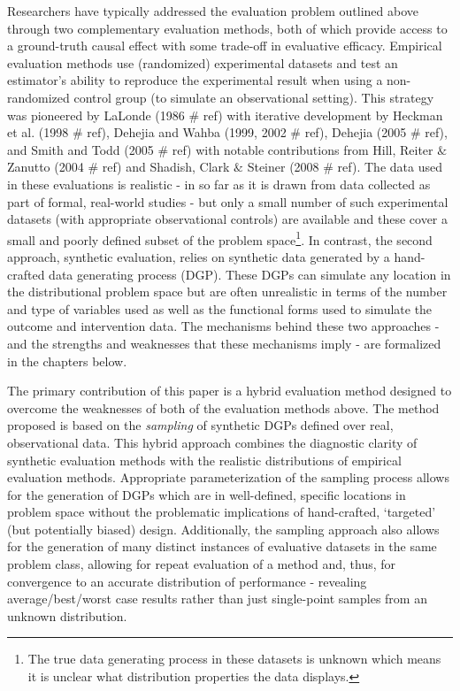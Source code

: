\documentclass[../main.tex]{subfiles}
\begin{document}
\vspace{\baselineskip}
Researchers have typically addressed the evaluation problem outlined above through two complementary evaluation methods, both of which provide access to a ground-truth causal effect with some trade-off in evaluative efficacy. Empirical evaluation methods use (randomized) experimental datasets and test an estimator’s ability to reproduce the experimental result when using a non-randomized control group (to simulate an observational setting). This strategy was pioneered by LaLonde (1986 $\#$ ref) with iterative development by Heckman et al. (1998 $\#$ ref), Dehejia and Wahba (1999, 2002 $\#$ ref), Dehejia (2005 $\#$ ref), and Smith and Todd (2005 $\#$ ref) with notable contributions from Hill, Reiter $\&$  Zanutto (2004 $\#$ ref) and Shadish, Clark $\&$  Steiner (2008 $\#$ ref). The data used in these evaluations is realistic - in so far as it is drawn from data collected as part of formal, real-world studies - but only a small number of such experimental datasets (with appropriate observational controls) are available and these cover a small and poorly defined subset of the problem space\footnote{ The true data generating process in these datasets is unknown which means it is unclear what distribution properties the data displays. }. In contrast, the second approach, synthetic evaluation, relies on synthetic data generated by a hand-crafted data generating process (DGP). These DGPs can simulate any location in the distributional problem space but are often unrealistic in terms of the number and type of variables used as well as the functional forms used to simulate the outcome and intervention data. The mechanisms behind these two approaches - and the strengths and weaknesses that these mechanisms imply - are formalized in the chapters below.\par


\vspace{\baselineskip}
The primary contribution of this paper is a hybrid evaluation method designed to overcome the weaknesses of both of the evaluation methods above. The method proposed is based on the \textit{sampling} of synthetic DGPs defined over real, observational data. This hybrid approach combines the diagnostic clarity of synthetic evaluation methods with the realistic distributions of empirical evaluation methods. Appropriate parameterization of the sampling process allows for the generation of DGPs which are in well-defined, specific locations in problem space without the problematic implications of hand-crafted, ‘targeted’ (but potentially biased) design. Additionally, the sampling approach also allows for the generation of many distinct instances of evaluative datasets in the same problem class, allowing for repeat evaluation of a method and, thus, for convergence to an accurate distribution of performance - revealing average/best/worst case results rather than just single-point samples from an unknown distribution.\par
\end{document}
